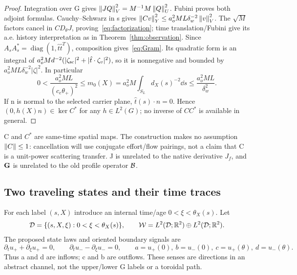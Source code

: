 \begin{proof}
Integration over G gives $\left\lVert JQ\right\rVert_V^2=M^{-1}M\left\lVert Q\right\rVert_U^2$. Fubini proves both adjoint formulas. Cauchy--Schwarz in s gives
$\left\lVert Cv\right\rVert_Y^2\le a_o^2ML\delta_w^{-2}\left\lVert v\right\rVert_V^2$.
The $\sqrt M$ factors cancel in $CD_\theta J$, proving~\eqref{eq:factorization}; time translation/Fubini give its a.e. history interpretation as in Theorem~\ref{thm:observation}. Since $A_sA_s^*=\operatorname{diag}(1,\hat t\hat t^T)$, composition gives~\eqref{eq:Gram}. Its quadratic form is an integral of
$a_o^2Md^{-2}(|\zeta_{\rm sc}|^2+|\hat t\cdot\zeta_v|^2)$, so it is nonnegative and bounded by $a_o^2ML\delta_w^{-2}|\zeta|^2$. In particular
\begin{equation}\label{eq:scalarGram}
0<\frac{a_o^2ML}{(c_e\theta_+)^2}\le
m_0(X)=a_o^2M\int_{S_L}d_X(s)^{-2}\dd s
\le\frac{a_o^2ML}{\delta_w^2}.
\end{equation}
If n is normal to the selected carrier plane, $\hat t(s)\cdot n=0$. Hence $(0,h(X)n)\in\ker C^*$ for any $h\in L^2(G)$; no inverse of $CC^*$ is available in general.
\end{proof}

C and $C^*$ are same-time spatial maps. The construction makes no assumption $\left\lVert C\right\rVert\le1$: cancellation will use conjugate effort/flow pairings, not a claim that C is a unit-power scattering transfer. J is unrelated to the native derivative $J_f$, and $\mathbf G$ is unrelated to the old profile operator $\mathcal B$.

\subsection{Two traveling states and their time traces}
For each label $(s,X)$ introduce an internal time/age $0<\xi<\theta_X(s)$. Let
\begin{equation}\label{eq:lineSpace}
\mathcal D=\{(s,X,\xi):0<\xi<\theta_X(s)\},\qquad
\mathcal W=L^2(\mathcal D;\mathbb R^2)\oplus L^2(\mathcal D;\mathbb R^2).
\end{equation}
The proposed state laws and oriented boundary signals are
\begin{equation}\label{eq:transportPDE}
\partial_tu_++\partial_\xi u_+=0,\qquad
\partial_tu_--\partial_\xi u_-=0,
\qquad a=u_+(0),\ b=u_-(0),\ c=u_+(\theta),\ d=u_-(\theta).
\end{equation}
Thus a and d are inflows; c and b are outflows. These senses are directions in an abstract channel, not the upper/lower G labels or a toroidal path.

